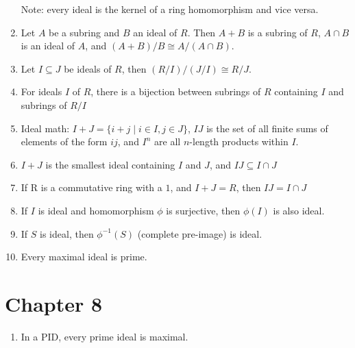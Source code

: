 \documentclass{article}
\begin{document}
\begin{enumerate}[1.]
        Note: every ideal is the kernel of a ring homomorphism and vice
        versa.
    \item Let $A$ be a subring and $B$ an ideal of $R$. Then $A + B$ is a
        subring of $R$, $A \cap B$ is an ideal of $A$, and $(A+B)/B \cong
        A/(A \cap B)$.
    \item Let $I \subseteq J$ be ideals of $R$, then $(R/I)/(J/I) \cong
        R/J$.
    \item For ideals $I$ of $R$, there is a bijection between subrings of
    $R$ containing $I$ and subrings of $R/I$
    \item Ideal math: $I+J = \{i+j \mid i \in I, j \in J\}$, $IJ$ is the set
        of all finite sums of elements of the form $ij$, and $I^n$ are all
        $n$-length products within $I$.
    \item $I+J$ is the smallest ideal containing $I$ and $J$, and $IJ \subseteq
    I \cap J$
    \item If R is a commutative ring with a $1$, and $I+J = R$, then $IJ =
    I \cap J$
    \item If $I$ is ideal and homomorphism $\phi$ is surjective, then $\phi(I)$
    is also ideal.
    \item If $S$ is ideal, then $\phi^{-1}(S)$ (complete pre-image) is ideal.
    \item Every maximal ideal is prime.
\end{enumerate}

\section*{Chapter 8}

\begin{enumerate}
    \item In a PID, every prime ideal is maximal.
\end{enumerate}
\end{document}
